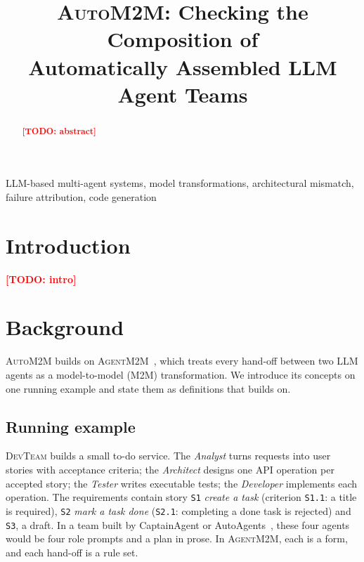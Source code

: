 \documentclass[10pt,conference]{IEEEtran}
\theoremstyle{definition}
\newcommand{\tool}{\textsc{AgentM2M}}
\newcommand{\auto}{\textsc{AutoM2M}}
\newcommand{\devteam}{\textsc{DevTeam}}
\newcommand{\code}[1]{\texttt{#1}}
\newcommand{\todo}[1]{\textcolor{red}{\textbf{[TODO: #1]}}}
\begin{document}
\title{\textsc{AutoM2M}: Checking the Composition of\\Automatically Assembled LLM Agent Teams}


\maketitle

\begin{abstract}
\todo{abstract}
\end{abstract}

\begin{IEEEkeywords}
LLM-based multi-agent systems, model transformations, architectural mismatch, failure attribution, code generation
\end{IEEEkeywords}

\section{Introduction}\label{sec:intro}
\todo{intro}

\section{Background}\label{sec:background}

\auto{} builds on \tool{}~\cite{agentm2m2026}, which treats every hand-off
between two LLM agents as a model-to-model (M2M) transformation. We introduce
its concepts on one running example and state them as definitions that
 builds on.

\subsection{Running example}\label{sec:example}

\devteam{} builds a small to-do service. The \emph{Analyst} turns requests into
user stories with acceptance criteria; the \emph{Architect} designs one API
operation per accepted story; the \emph{Tester} writes executable tests; the
\emph{Developer} implements each operation. The requirements contain story
\code{S1} \emph{create a task} (criterion \code{S1.1}: a title is required),
\code{S2} \emph{mark a task done} (\code{S2.1}: completing a done task is
rejected) and \code{S3}, a draft. In a team built by CaptainAgent or
AutoAgents~\cite{song2024captain,chen2024autoagents}, these four agents would be
four role prompts and a plan in prose. In \tool{}, each is a form, and each
hand-off is a rule set.
\end{document}
